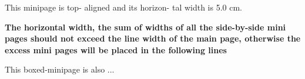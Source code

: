 \documentclass[11pt,a4paper]{article}
\begin{document}
	\begin{minipage}[t]{0.6\linewidth} %
		This minipage is top- aligned and its horizon- tal width is 5.0 cm.
		
		\bfseries\large The horizontal width, the sum of widths of all the side-by-side mini pages should not exceed the line width of the main page, otherwise the excess mini pages will be placed in the following lines
		 \end{minipage}
	\begin{boxedminipage}[t]{0.4\linewidth}
		This boxed-minipage is also ... 
		
		\end{boxedminipage}
\end{document}
